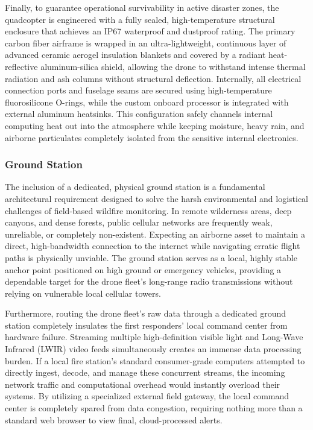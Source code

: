 \documentclass[journal, onecolumn]{IEEEtran}
\begin{document}
Finally, to guarantee operational survivability in active disaster zones, the quadcopter is engineered with a fully sealed, high-temperature structural enclosure that achieves an IP67 waterproof and dustproof rating. The primary carbon fiber airframe is wrapped in an ultra-lightweight, continuous layer of advanced ceramic aerogel insulation blankets and covered by a radiant heat-reflective aluminum-silica shield, allowing the drone to withstand intense thermal radiation and ash columns without structural deflection. Internally, all electrical connection ports and fuselage seams are secured using high-temperature fluorosilicone O-rings, while the custom onboard processor is integrated with external aluminum heatsinks. This configuration safely channels internal computing heat out into the atmosphere while keeping moisture, heavy rain, and airborne particulates completely isolated from the sensitive internal electronics.

\subsubsection{Ground Station}

The inclusion of a dedicated, physical ground station is a fundamental architectural requirement designed to solve the harsh environmental and logistical challenges of field-based wildfire monitoring. In remote wilderness areas, deep canyons, and dense forests, public cellular networks are frequently weak, unreliable, or completely non-existent. Expecting an airborne asset to maintain a direct, high-bandwidth connection to the internet while navigating erratic flight paths is physically unviable. The ground station serves as a local, highly stable anchor point positioned on high ground or emergency vehicles, providing a dependable target for the drone fleet's long-range radio transmissions without relying on vulnerable local cellular towers.

Furthermore, routing the drone fleet's raw data through a dedicated ground station completely insulates the first responders' local command center from hardware failure. Streaming multiple high-definition visible light and Long-Wave Infrared (LWIR) video feeds simultaneously creates an immense data processing burden. If a local fire station's standard consumer-grade computers attempted to directly ingest, decode, and manage these concurrent streams, the incoming network traffic and computational overhead would instantly overload their systems. By utilizing a specialized external field gateway, the local command center is completely spared from data congestion, requiring nothing more than a standard web browser to view final, cloud-processed alerts.
\end{document}
